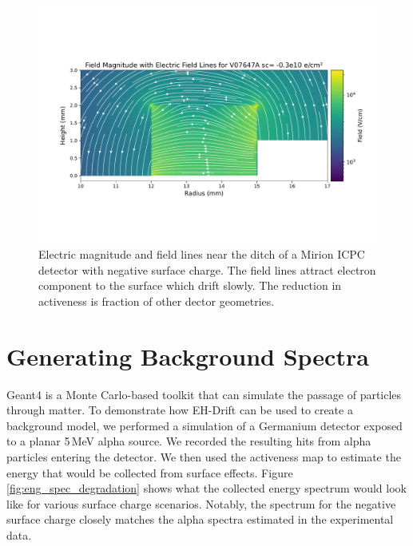\begin{figure}%
\centering
\includegraphics[trim={0cm 3cm 0cm 4.69cm},clip,width=0.99\linewidth]{ch5/figs/elect_field_lines_surface_V07647A_sc_-0.3.pdf}
\caption{Electric magnitude and field lines near the ditch of a Mirion ICPC detector with negative surface charge. The field lines attract electron component to the surface which drift slowly. The reduction in activeness is fraction of other dector geometries.}
\label{ch5_fig_elect_field_lines_surface_V07647A}
\end{figure}


\section{\label{res:3} Generating Background Spectra}

Geant4 is a Monte Carlo-based toolkit that can simulate the passage of particles through matter. To demonstrate how EH-Drift can be used to create a background model, we performed a {\geant} simulation of a Germanium detector exposed to a planar 5\,MeV alpha source. We recorded the resulting hits from alpha particles entering the detector. We then used the activeness map to estimate the energy that would be collected from surface effects. Figure \ref{fig:eng_spec_degradation} shows what the collected energy spectrum would look like for various surface charge scenarios. Notably, the spectrum for the negative surface charge closely matches the alpha spectra estimated in the experimental data.

